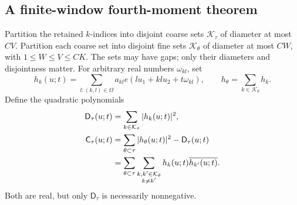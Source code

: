 \documentclass[11pt,reqno]{amsart}
\numberwithin{equation}{section}
\theoremstyle{definition}
\theoremstyle{remark}
\begin{document}
\subsection{A finite-window fourth-moment theorem}
Partition the retained $k$-indices into disjoint coarse sets $\mathcal K_\tau$ of diameter
at most $CV$. Partition each coarse set into disjoint fine sets $\mathcal K_\theta$ of
diameter at most $CW$, with $1\le W\le V\le CK$.
The sets may have gaps; only their diameters and disjointness matter.
For arbitrary real numbers $\omega_{kl}$, set
\begin{equation}\label{eq:hk}
 h_k(u;t)=\sum_{l:(k,l)\in\Omega}
 a_{kl}e(lu_1+klu_2+t\omega_{kl}),\qquad
 h_\theta=\sum_{k\in\mathcal K_\theta}h_k.
\end{equation}
Define the quadratic polynomials
\begin{align}
 \mathsf D_\tau(u;t)&=\sum_{k\in\mathcal K_\tau}|h_k(u;t)|^2,
       \label{eq:torusD}\\
 \mathsf C_\tau(u;t)&=\sum_{\theta\subset\tau}|h_\theta(u;t)|^2
                         -\mathsf D_\tau(u;t) \notag\\
 &=\sum_{\theta\subset\tau}
   \sum_{\substack{k,k'\in\mathcal K_\theta\\k\ne k'}}
                h_k(u;t)\overline{h_{k'}(u;t)}.\label{eq:torusC}
\end{align}
Both are real, but only $\mathsf D_\tau$ is necessarily nonnegative.
\end{document}

